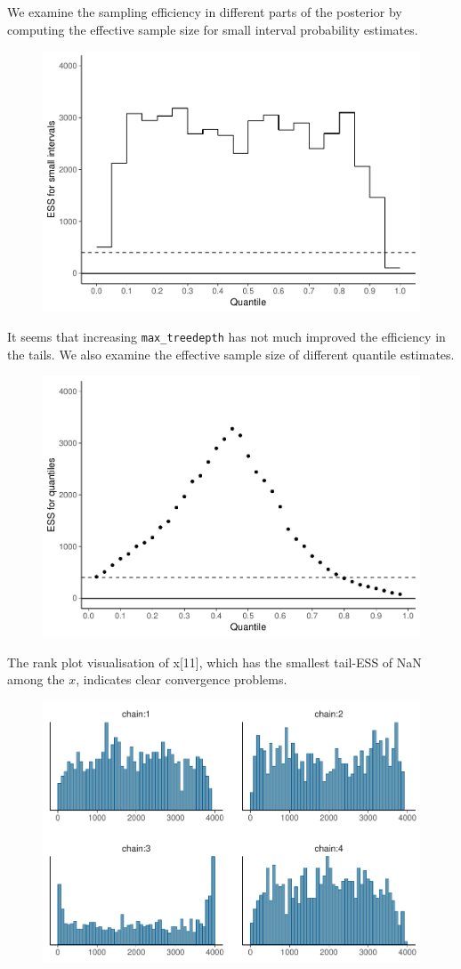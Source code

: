 \documentclass[american,]{article}
\begin{document}
We examine the sampling efficiency in different parts of the posterior
by computing the effective sample size for small interval probability
estimates.

\begin{figure}[tp]
  \centering
  \includegraphics[width=0.6\linewidth]{graphics/local-ess-fit-nom-td20-1.pdf}
\end{figure}

It seems that increasing \texttt{max\_treedepth} has not much improved
the efficiency in the tails. We also examine the effective sample size
of different quantile estimates.

\begin{figure}[tp]
  \centering
  \includegraphics[width=0.6\linewidth]{graphics/quantile-ess-fit-nom-td20-1.pdf}
\end{figure}

The rank plot visualisation of x{[}11{]}, which has the smallest
tail-ESS of NaN among the \(x\), indicates clear convergence problems.

\begin{figure}[tp]
  \centering
  \includegraphics[width=0.6\linewidth]{graphics/hist-fit-nom-td20-1.pdf}
\end{figure}
\end{document}
